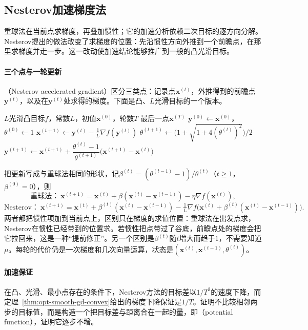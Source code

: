 \subsection{Nesterov加速梯度法}
\label{sec:opt-smooth-nesterov}

重球法在当前点求梯度，再叠加惯性；它的加速分析依赖二次目标的逐方向分解。Nesterov提出的做法改变了求梯度的位置：先沿惯性方向外推到一个前瞻点，在那里求梯度并走一步。这一改动使加速结论能够推广到一般的凸光滑目标\cite{nesterov1983method}。

\paragraph{三个点与一轮更新}
（Nesterov accelerated gradient）区分三类点：记录点$\bm x^{(t)}$，外推得到的前瞻点$\bm y^{(t)}$，以及在$\bm y^{(t)}$处求得的梯度。下面是凸、$L$光滑目标的一个版本\cite{beck2009fista}。

\begin{algorithm}[Nesterov加速梯度法]
\label{alg:opt-smooth-nesterov}
\begin{algorithmic}[1]
\Require $L$光滑凸目标$f$，常数$L$，初值$\bm x^{(0)}$，轮数$T$
\Ensure 最后一点$\bm x^{(T)}$
\State $\bm y^{(0)}\gets\bm x^{(0)}$，$\theta^{(0)}\gets1$
  \State $\bm x^{(t+1)}\gets\bm y^{(t)}-\frac1L\nabla f(\bm y^{(t)})$ 
  \State $\theta^{(t+1)}\gets\bigl(1+\sqrt{1+4(\theta^{(t)})^2}\bigr)/2$
  \State $\bm y^{(t+1)}\gets\bm x^{(t+1)}+\dfrac{\theta^{(t)}-1}{\theta^{(t+1)}}\bigl(\bm x^{(t+1)}-\bm x^{(t)}\bigr)$ 
\EndFor
\end{algorithmic}
\end{algorithm}

把更新写成与重球法相同的形状，记$\beta^{(t)}=(\theta^{(t-1)}-1)/\theta^{(t)}$（$t\geq1$，$\beta^{(0)}=0$），则
\[
  \text{重球法：}\ \bm x^{(t+1)}=\bm x^{(t)}+\beta(\bm x^{(t)}-\bm x^{(t-1)})-\eta\nabla f(\bm x^{(t)}),
\]
\[
  \text{Nesterov：}\ \bm x^{(t+1)}=\bm x^{(t)}+\beta^{(t)}(\bm x^{(t)}-\bm x^{(t-1)})-\tfrac1L\nabla f\bigl(\bm x^{(t)}+\beta^{(t)}(\bm x^{(t)}-\bm x^{(t-1)})\bigr).
\]
两者都把惯性项加到当前点上，区别只在梯度的求值位置：重球法在出发点求，Nesterov在惯性已经带到的位置求。若惯性把点带过了谷底，前瞻点处的梯度会把它拉回来，这是一种“提前修正”。另一个区别是$\beta^{(t)}$随$t$增大而趋于$1$，不需要知道$\mu$。每轮的代价仍是一次梯度和几次向量运算，状态是$(\bm x^{(t)},\bm x^{(t-1)},\theta^{(t)})$。

\paragraph{加速保证}
在凸、光滑、最小点存在的条件下，Nesterov方法的目标差以$1/T^2$的速度下降，而定理~\ref{thm:opt-smooth-gd-convex}给出的梯度下降保证是$1/T$。证明不比较相邻两步的目标值，而是构造一个把目标差与距离合在一起的量，即（potential function），证明它逐步不增。

